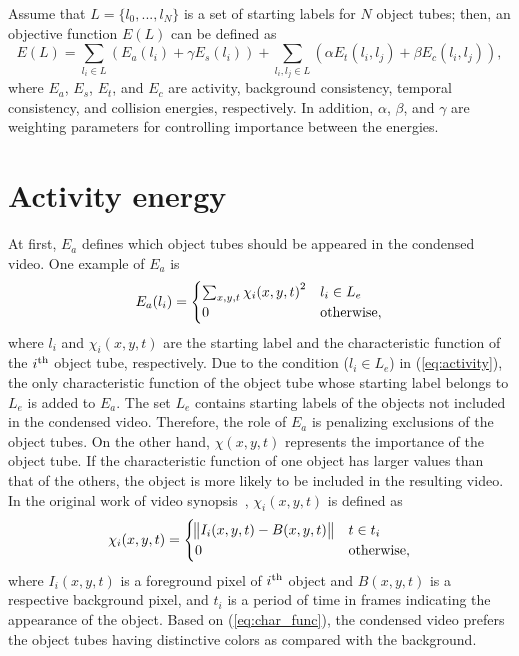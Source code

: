 \documentclass[11pt]{hyu_thesis}
\begin{document}
Assume that $L=\{l_0,...,l_N\}$ is a set of starting labels for $N$ object tubes; then, an objective function $E(L)$ can be defined as
\begin{equation}
\label{eq:basic_form}
E(L)=\sum_{l_i \in L} \left( E_a(l_i) + \gamma E_s(l_i) \right) + \sum_{l_i,l_j \in L} \left( \alpha E_t(l_i, l_j) + \beta E_c(l_i, l_j) \right),
\end{equation}
where $E_a$, $E_s$, $E_t$, and $E_c$ are activity, background consistency, temporal consistency, and collision energies, respectively. In addition, $\alpha$, $\beta$, and $\gamma$ are weighting parameters for controlling importance between the energies.

\section{Activity energy}
At first, $E_a$ defines which object tubes should be appeared in the condensed video. One example of $E_a$ is
\begin{equation}
\label{eq:activity}
E_a(l_i) =
\begin{cases}
\sum_{x,y,t} {\chi_i (x,y,t)}^2 & l_i \in L_e \\
0 & \rm{otherwise},
\end{cases}
\end{equation}
where $l_i$ and $\chi_i (x,y,t)$ are the starting label and the characteristic function of the $i^{\rm{th}}$ object tube, respectively. Due to the condition ($l_i \in L_e$) in (\ref{eq:activity}), the only characteristic function of the object tube whose starting label belongs to $L_e$ is added to $E_a$. The set $L_e$ contains starting labels of the objects not included in the condensed video. Therefore, the role of $E_a$ is penalizing exclusions of the object tubes. On the other hand, $\chi (x,y,t)$ represents the importance of the object tube. If the characteristic function of one object has larger values than that of the others, the object is more likely to be included in the resulting video. In the original work of video synopsis~\cite{Rav-Acha2006,Pritch2007,Pritch2008}, $\chi_i (x,y,t)$ is defined as
\begin{equation}
\label{eq:char_func}
\chi_i(x,y,t)=
\begin{cases}
\norm{I_i(x,y,t)-B(x,y,t)} & t \in t_i\\
0 & \rm{otherwise},
\end{cases}
\end{equation}
where $I_i(x,y,t)$ is a foreground pixel of $i^{\rm{th}}$ object and $B(x,y,t)$ is a respective background pixel, and $t_i$ is a period of time in frames indicating the appearance of the object. Based on (\ref{eq:char_func}), the condensed video prefers the object tubes having distinctive colors as compared with the background. 
\end{document}
